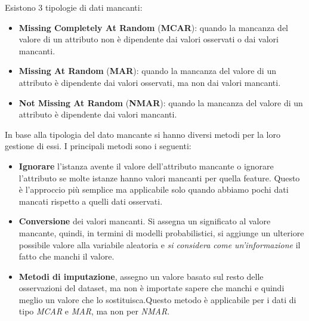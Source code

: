 Esistono 3 tipologie di dati mancanti:
\begin{itemize}
      \item \textbf{Missing Completely At Random} (\textbf{MCAR}): quando la
            mancanza del valore di un attributo non è dipendente dai valori
            osservati o dai valori mancanti.
      \item \textbf{Missing At Random} (\textbf{MAR}): quando la mancanza del
            valore di un attributo è dipendente dai valori osservati, ma non dai
            valori mancanti.
      \item \textbf{Not Missing At Random} (\textbf{NMAR}): quando la mancanza del
            valore di un attributo è dipendente dai valori mancanti.
\end{itemize}
In base alla tipologia del dato mancante si hanno diversi metodi per la loro
gestione di essi. I principali metodi sono i seguenti:
\begin{itemize}
      \item \textbf{Ignorare} l'istanza avente il valore dell'attributo mancante o
            ignorare l'attributo se molte istanze hanno valori mancanti per quella
            feature. Questo è l'approccio più semplice ma applicabile solo quando
            abbiamo pochi dati mancati rispetto a quelli dati osservati.
      \item \textbf{Conversione} dei valori mancanti. Si assegna un significato al
            valore mancante, quindi, in termini di modelli probabilistici, si
            aggiunge un ulteriore possibile valore alla variabile aleatoria e
            \textit{si considera come un'informazione} il fatto che manchi il valore.
      \item \textbf{Metodi di imputazione}, assegno un valore basato sul resto delle
            osservazioni del dataset, ma non è importate sapere che manchi e quindi
            meglio un valore che lo sostituisca.Questo metodo è applicabile per i
            dati di tipo \textit{MCAR} e \textit{MAR}, ma non per \textit{NMAR}.
\end{itemize}
